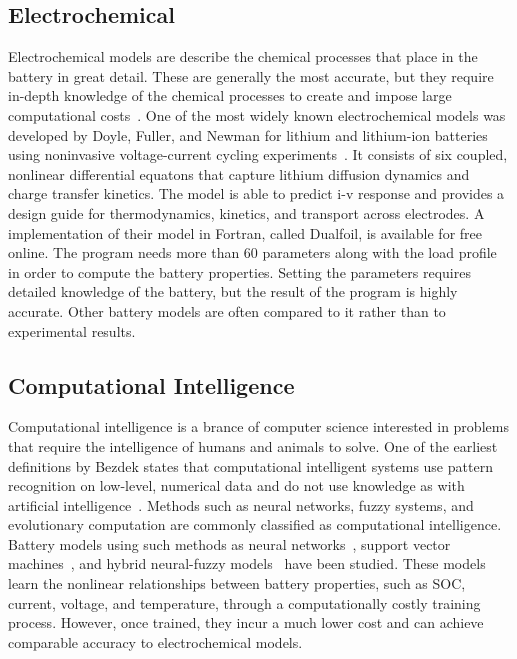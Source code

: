 \documentclass[../zhang_thesis.tex]{subfiles}
\begin{document}
\subsection{Electrochemical}

Electrochemical models are describe the chemical processes that place in the battery in great detail. These are generally the most accurate, but they require in-depth knowledge of the chemical processes to create and impose large computational costs~\cite{jongerden09}. One of the most widely known electrochemical models was developed by Doyle, Fuller, and Newman for lithium and lithium-ion batteries using noninvasive voltage-current cycling
experiments~\cite{doyle93,fuller94,fuller94b}. It consists of six coupled, nonlinear differential equatons that capture lithium diffusion dynamics and charge transfer kinetics. The model is able to predict i-v response and provides a design guide for thermodynamics, kinetics, and transport across electrodes. A implementation of their model in Fortran, called Dualfoil, is available for free online. The program needs more than 60 parameters along with the load profile
in order to compute the battery properties. Setting the parameters requires detailed knowledge of the battery, but the result of the program is highly accurate. Other battery models are often compared to it rather than to experimental results.

\subsection{Computational Intelligence}

Computational intelligence is a brance of computer science interested in problems that require the intelligence of humans and animals to solve. One of the earliest definitions by Bezdek states that computational intelligent systems use pattern recognition on low-level, numerical data and do not use knowledge as with artificial intelligence~\cite{bezdek92,bezdek94}. Methods such as neural networks, fuzzy systems, and evolutionary computation are commonly classified as computational
intelligence. Battery models using such methods as neural networks~\cite{ogorman98,capizzi11}, support vector machines~\cite{wang06}, and hybrid neural-fuzzy models~\cite{shen02} have been studied. These models learn the nonlinear relationships between battery properties, such as SOC, current, voltage, and temperature, through a computationally costly training process. However, once trained, they incur a much lower cost and can achieve comparable accuracy to electrochemical
models.
\end{document}
